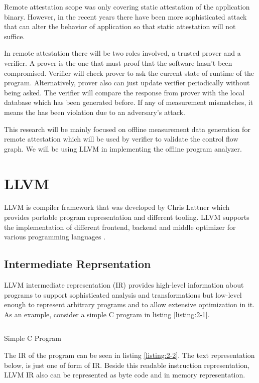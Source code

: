 Remote attestation scope was only covering static attestation of the application binary. However, in the recent years there have been more sophisticated attack that can alter the behavior of application so that static attestation will not suffice. 

In remote attestation there will be two roles involved, a trusted prover and a verifier. A prover is the one that must proof that the software hasn't been compromised. Verifier will check prover to ask the current state of runtime of the program. Alternatively, prover also can just update verifier periodically without being asked. The verifier will compare the response from prover with the local database which has been generated before. If any of measurement mismatches, it means the has been violation due to an adversary's attack.

This research will be mainly focused on offline measurement data generation for remote attestation which will be used by verifier to validate the control flow graph. We will be using LLVM in implementing the offline program analyzer.

\section{LLVM}

LLVM is compiler framework that was developed by Chris Lattner which provides portable program representation and different tooling. LLVM supports the implementation of different frontend, backend and middle optimizer for various programming languages \cite{lattnerLLVMCompilationFramework2004a}. 

\subsection{Intermediate Reprsentation}

LLVM intermediate representation (IR) provides high-level information about programs to support sophisticated analysis and transformations but low-level enough to represent arbitrary programs and to allow extensive optimization in it. As an example, consider a simple C program in listing \ref{listing:2-1}.

\begin{listing}
\inputminted[]{c}{code/sample.c}
\caption{Simple C Program}    
\label{listing:2-1}
\end{listing}

The IR of the program can be seen in listing \ref{listing:2-2}. The text representation below, is just one of form of IR. Beside this readable instruction representation, LLVM IR also can be represented as byte code and in memory representation.

